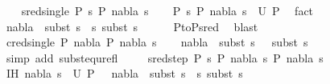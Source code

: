 \begin{isabellebody}
\ \ \isamarkupfalse%
\ {\isacharparenleft}{\kern0pt}sred{\isacharunderscore}{\kern0pt}single\ P{}\ s\ P{}\ nabla{}\ s{}{\isacharparenright}{\kern0pt}\isanewline
\ \ \isamarkupfalse%
\ {\isachardoublequoteopen}P{}\ {\isasymturnstile}s\ {\isasymleadsto}P{}{\isachardoublequoteclose}\ {\isachardoublequoteopen}{\isacharparenleft}{\kern0pt}nabla{}{\isacharcomma}{\kern0pt}\ s{}{\isacharparenright}{\kern0pt}\ {\isasymin}\ U\ P{}{\isachardoublequoteclose}\ \isamarkupfalse%
\ fact{\isacharplus}{\kern0pt}\isanewline
\ \ \isamarkupfalse%
\ \isamarkupfalse%
\ {\isachardoublequoteopen}nabla{}\ {\isasymTurnstile}\ subst\ {\isacharparenleft}{\kern0pt}s{}\ {\isasymbullet}\ s{\isacharparenright}{\kern0pt}\ {\isasymapprox}subst\ s{}{\isachardoublequoteclose}\isanewline
\ \ \ \ \isamarkupfalse%
\ P{}{\isacharunderscore}{\kern0pt}to{\isacharunderscore}{\kern0pt}P{}{\isacharunderscore}{\kern0pt}sred\ \isamarkupfalse%
\ blast\isanewline
{}\isamarkupfalse%
\isanewline
\ \ \isamarkupfalse%
\ {\isacharparenleft}{\kern0pt}cred{\isacharunderscore}{\kern0pt}single\ P{}\ nabla{}\ P{}\ nabla{}\ s{}{\isacharparenright}{\kern0pt}\isanewline
\ \ \isamarkupfalse%
\ {\isachardoublequoteopen}nabla{}\ {\isasymTurnstile}\ subst\ {\isacharparenleft}{\kern0pt}s{}\ {\isasymbullet}\ {\isacharbrackleft}{\kern0pt}{\isacharbrackright}{\kern0pt}{\isacharparenright}{\kern0pt}\ {\isasymapprox}subst\ s{}{\isachardoublequoteclose}\isanewline
\ \ \ \ \isamarkupfalse%
\ {\isacharparenleft}{\kern0pt}simp\ add{\isacharcolon}{\kern0pt}\ subst{\isacharunderscore}{\kern0pt}equ{\isacharunderscore}{\kern0pt}refl{\isacharparenright}{\kern0pt}\ \isanewline
{}\isamarkupfalse%
\isanewline
\ \ \isamarkupfalse%
\ {\isacharparenleft}{\kern0pt}sred{\isacharunderscore}{\kern0pt}step\ P{}\ s\ P{}\ nabla{}\ s{}\ P{}\ nabla{}\ s{}{\isacharparenright}{\kern0pt}\isanewline
\ \ \isamarkupfalse%
\ IH{\isacharcolon}{\kern0pt}\ {\isachardoublequoteopen}{\isacharparenleft}{\kern0pt}nabla{}{\isacharcomma}{\kern0pt}\ s{}{\isacharparenright}{\kern0pt}\ {\isasymin}\ U\ P{}\ {\isasymLongrightarrow}\ \ nabla{}\ {\isasymTurnstile}\ subst\ {\isacharparenleft}{\kern0pt}s{}\ {\isasymbullet}\ s{}{\isacharparenright}{\kern0pt}\ {\isasymapprox}subst\ s{}{\isachardoublequoteclose}\ \isamarkupfalse%

\end{isabellebody}
